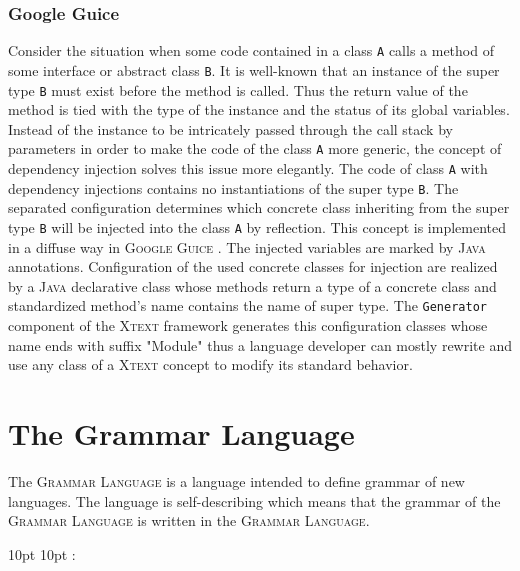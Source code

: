 \documentclass[12pt,notitlepage,a4paper]{report}
\begin{document}
\subsubsection{Google Guice}
\label{GoogleGuice}
Consider the situation when some code contained in a class \texttt{A} calls a method of some interface or abstract class \texttt{B}. It is well-known that  an instance of the super type \texttt{B} must exist before the method is called.  Thus the return value of the method is tied with the type of the instance and the status of its global variables. Instead of the instance to be intricately passed through the call stack  by parameters in order to make the code of the class \texttt{A} more generic, the concept of dependency injection solves this issue more elegantly. The code of class \texttt{A} with dependency injections contains no instantiations of the super type \texttt{B}. The separated configuration determines which concrete class inheriting from the super type \texttt{B} will be injected into the class \texttt{A} by reflection. This concept is implemented in a diffuse way in \textsc{Google Guice} \cite{Guice}. The injected variables are marked by \textsc{Java} annotations. Configuration of the used concrete classes for injection are realized by a \textsc{Java} declarative class whose methods return a type of a concrete class and standardized method's name contains the name of super type. The \texttt{Generator} component of the \textsc{Xtext} framework generates this configuration classes whose name ends with suffix "Module" thus a language developer can mostly rewrite and use any class of a \textsc{Xtext} concept to modify its standard behavior. 

\section {The Grammar Language}

The \textsc{Grammar Language} is a language intended to define grammar of new languages. The language is self-describing which means that the grammar of the \textsc{Grammar Language} is written in the \textsc{Grammar Language}.

  {10pt}%
  {10pt}%
  {\small}%
  {}%
  {\small\bfseries}%
  {:}%
  { }%
  {}%
\theoremstyle{exampleStyle}
\newtheorem{expl}{Listing}[chapter]
\end{document}
